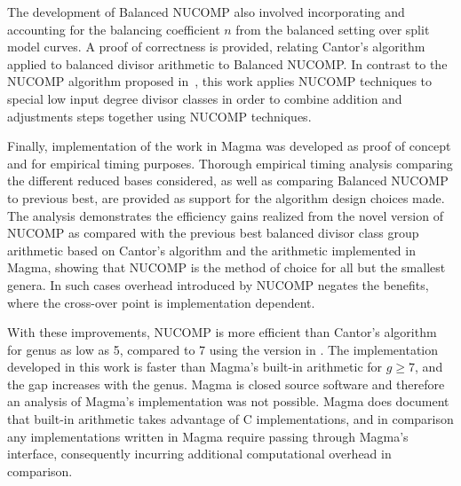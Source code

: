 The development of Balanced NUCOMP also involved incorporating and accounting
for the balancing coefficient $n$ from the balanced setting over split model
curves. A proof of correctness is provided, relating Cantor's algorithm applied
to balanced divisor arithmetic to Balanced NUCOMP. In contrast to the NUCOMP
algorithm proposed in~\cite{jacobson_fast_2007}, this work applies NUCOMP
techniques to special low input degree divisor classes in order to combine
addition and adjustments steps together using NUCOMP techniques.

Finally, implementation of the work in Magma was developed as proof of concept
and for empirical timing purposes. Thorough empirical timing analysis comparing
the different reduced bases considered, as well as comparing Balanced NUCOMP to
previous best, are provided as support for the algorithm design choices made.
The analysis demonstrates the efficiency gains realized from the novel version
of NUCOMP as compared with the previous best balanced divisor class group
arithmetic based on Cantor's algorithm and the arithmetic implemented in Magma,
showing that NUCOMP is the method of choice for all but the smallest genera. In
such cases overhead introduced by NUCOMP negates the benefits, where the
cross-over point is implementation dependent.

With these improvements, NUCOMP is more efficient than Cantor's algorithm for
genus as low as 5, compared to 7 using the version in \cite{jacobson_fast_2007}.
The implementation developed in this work is faster than Magma's built-in
arithmetic for $g \geq 7$, and the gap increases with the genus. Magma is closed
source software and therefore an analysis of Magma's implementation was not
possible. Magma does document that built-in arithmetic takes advantage of C
implementations, and in comparison any implementations written in Magma require
passing through Magma's interface, consequently incurring additional
computational overhead in comparison.



